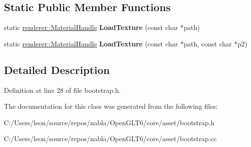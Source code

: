 \subsection*{Static Public Member Functions}
\begin{DoxyCompactItemize}
\item 
\mbox{\label{classnabla_1_1_asset_manager_a5644a198547e2fcccb4a93b42d0a9724}} 
static \mbox{\hyperlink{classnabla_1_1renderer_1_1_handle}{renderer\+::\+Material\+Handle}} {\bfseries Load\+Texture} (const char $\ast$path)
\item 
\mbox{\label{classnabla_1_1_asset_manager_a939bf55d2e1d35fc07f42416d504ae64}} 
static \mbox{\hyperlink{classnabla_1_1renderer_1_1_handle}{renderer\+::\+Material\+Handle}} {\bfseries Load\+Texture} (const char $\ast$path, const char $\ast$p2)
\end{DoxyCompactItemize}


\subsection{Detailed Description}


Definition at line 28 of file bootstrap.\+h.



The documentation for this class was generated from the following files\+:\begin{DoxyCompactItemize}
\item 
C\+:/\+Users/leon/source/repos/nabla/\+Open\+G\+L\+T6/core/asset/bootstrap.\+h\item 
C\+:/\+Users/leon/source/repos/nabla/\+Open\+G\+L\+T6/core/asset/bootstrap.\+cc\end{DoxyCompactItemize}
